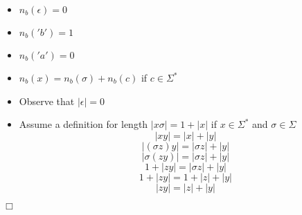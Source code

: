 \begin{center}
\begin{itemize}
  \item $n_{b}(\epsilon) = 0$ \\
  \item $n_{b}('b') = 1$ \\
  \item $n_{b}('a') = 0$ \\
  \item $n_{b}(x) = n_{b}(\sigma)+n_{b}(c)   $ if $c \in \Sigma^*$
  \end{itemize}
\end{center}

\begin{center}
  \begin{itemize}
    \item Observe that $|\epsilon| = 0$

    \item Assume a definition for length  $|x\sigma| = 1+|x|$ if  $x \in \Sigma^*$ and  $\sigma \in \Sigma$
    \[ |xy| = |x|+|y| \]
    \[|({\sigma}z)y| = |{\sigma}z| + |y| \]
    \[|{\sigma}(zy)| = |{\sigma}z| + |y| \]
    \[ 1 + |zy| = |{\sigma}z| + |y| \]
    \[ 1 + |zy| = 1 + |z| + |y|  \]
    \[|zy| = |z| + |y| \]
    
  \end{itemize}
\end{center}
\indent \indent $\Box$

